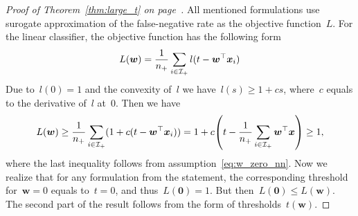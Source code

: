 \larget*
\begin{proof}[Proof of Theorem~\ref{thm:large_t} on page~\pageref{thm:large_t}]
  All mentioned formulations use surogate approximation of the false-negative rate as the objective function~$L.$ For the linear classifier, the objective function has the following form
  \begin{equation*}
    L(\bm{w})
      = \frac{1}{n_{+}}\sum_{i \in \mathcal{I}_{+}}l(t - \bm{w}^{\top} \bm{x}_i)
  \end{equation*}
  Due to~$l(0) = 1$ and the convexity of~$l$ we have~$l(s) \geq 1 + cs$, where~$c$ equals to the derivative of~$l$ at~$0$. Then we have
  \begin{equation*}
    L(\bm{w}) 
      \geq \frac{1}{\npos} \sum_{i \in \Ipos}(1 + c(t-\bm{w}^{\top} \bm{x}_i))
      = 1 + c\Brac{t - \frac{1}{\npos}\sum_{i \in \Ipos}\bm{w}^{\top} \bm{x}}
      \geq 1,
  \end{equation*}
  where the last inequality follows from assumption~\eqref{eq:w_zero_nn}. Now we realize that for any formulation from the statement, the corresponding threshold for~$\bm{w}=0$ equals to~$t=0$, and thus~$L(\bm{0})=1$. But then~$L(\bm{0}) \leq L(\bm{w})$. The second part of the result follows from the form of thresholds~$t(\bm{w})$.
\end{proof}

